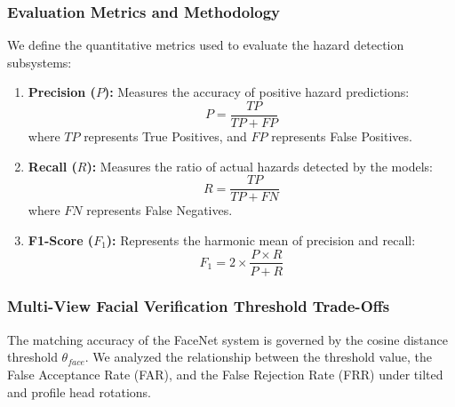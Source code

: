 \documentclass[12pt,a4paper]{article}
\begin{document}
\begin{table}[h]
    \centering
    \caption{Fire and Smoke Detection Model Comparison on Edge Hardware (CPU Mode)}
    \label{tab:fire_comparison}
\end{table}

\subsubsection*{Evaluation Metrics and Methodology}
We define the quantitative metrics used to evaluate the hazard detection subsystems:
\begin{enumerate}
    \item \textbf{Precision ($P$):} Measures the accuracy of positive hazard predictions:
    \begin{equation}
        P = \frac{TP}{TP + FP}
    \end{equation}
    where $TP$ represents True Positives, and $FP$ represents False Positives.
    
    \item \textbf{Recall ($R$):} Measures the ratio of actual hazards detected by the models:
    \begin{equation}
        R = \frac{TP}{TP + FN}
    \end{equation}
    where $FN$ represents False Negatives.
    
    \item \textbf{F1-Score ($F_1$):} Represents the harmonic mean of precision and recall:
    \begin{equation}
        F_1 = 2 \times \frac{P \times R}{P + R}
    \end{equation}
\end{enumerate}

\subsubsection*{Multi-View Facial Verification Threshold Trade-Offs}
The matching accuracy of the FaceNet system is governed by the cosine distance threshold $\theta_{face}$. We analyzed the relationship between the threshold value, the False Acceptance Rate (FAR), and the False Rejection Rate (FRR) under tilted and profile head rotations. 
\end{document}
